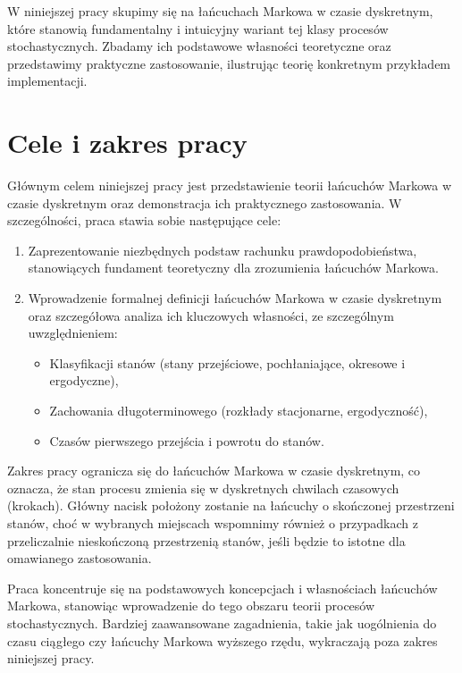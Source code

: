 \documentclass[final,a4paper,openany,12pt]{mwbk}
\begin{document}
W niniejszej pracy skupimy się na łańcuchach Markowa w czasie dyskretnym, które stanowią fundamentalny i intuicyjny wariant tej klasy procesów stochastycznych. Zbadamy ich podstawowe własności teoretyczne oraz przedstawimy praktyczne zastosowanie, ilustrując teorię konkretnym przykładem implementacji.

\section{Cele i zakres pracy}

Głównym celem niniejszej pracy jest przedstawienie teorii łańcuchów Markowa w czasie dyskretnym oraz demonstracja ich praktycznego zastosowania. W szczególności, praca stawia sobie następujące cele:

\begin{enumerate}
    \item Zaprezentowanie niezbędnych podstaw rachunku prawdopodobieństwa, stanowiących fundament teoretyczny dla zrozumienia łańcuchów Markowa.
    
    \item Wprowadzenie formalnej definicji łańcuchów Markowa w czasie dyskretnym oraz szczegółowa analiza ich kluczowych własności, ze szczególnym uwzględnieniem:
    \begin{itemize}
        \item Klasyfikacji stanów (stany przejściowe, pochłaniające, okresowe i ergodyczne),
        \item Zachowania długoterminowego (rozkłady stacjonarne, ergodyczność),
        \item Czasów pierwszego przejścia i powrotu do stanów.
    \end{itemize}
    
\end{enumerate}

Zakres pracy ogranicza się do łańcuchów Markowa w czasie dyskretnym, co oznacza, że stan procesu zmienia się w dyskretnych chwilach czasowych (krokach). Główny nacisk położony zostanie na łańcuchy o skończonej przestrzeni stanów, choć w wybranych miejscach wspomnimy również o przypadkach z przeliczalnie nieskończoną przestrzenią stanów, jeśli będzie to istotne dla omawianego zastosowania.

Praca koncentruje się na podstawowych koncepcjach i własnościach łańcuchów Markowa, stanowiąc wprowadzenie do tego obszaru teorii procesów stochastycznych. Bardziej zaawansowane zagadnienia, takie jak uogólnienia do czasu ciągłego czy łańcuchy Markowa wyższego rzędu, wykraczają poza zakres niniejszej pracy.
\end{document}
